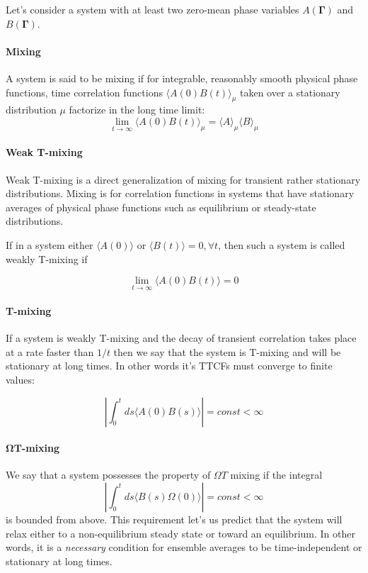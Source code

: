 \documentclass[a4paper,12pt,nofootinbib]{article}
\begin{document}
Let's consider a system with at least two zero-mean phase variables $A(\bm{\Gamma})$ and $B(\bm{\Gamma})$. 

\paragraph{Mixing}

A system is said to be mixing if for integrable, reasonably smooth physical phase functions, time correlation functions $\langle A(0) B(t) \rangle_{\mu}$ taken over a stationary distribution $\mu$ factorize in the long time limit:
\begin{equation}
  \lim_{t \to \infty} \langle A(0) B(t)\rangle_{\mu} = \langle A \rangle_{\mu} \langle B \rangle_{\mu}  
\end{equation}

\paragraph{Weak T-mixing}

Weak T-mixing is a direct generalization of mixing for transient rather stationary distributions. Mixing is for correlation functions in systems that have stationary averages of physical phase functions such as equilibrium or steady-state distributions.

If in a system either $\langle A(0) \rangle $ or $ \langle B(t) \rangle = 0, \forall t $, then such a system is called weakly T-mixing if

\begin{equation}
  \lim_{t \to \infty} \langle A(0) B(t) \rangle = 0
\end{equation}

\paragraph{T-mixing}
If a system is weakly T-mixing and the decay of transient correlation takes place at a rate faster than $1/t$ then we say that the system is T-mixing and will be stationary at long times. In other words it's TTCFs must converge to finite values:

\begin{equation}
  \left| \int_0^t ds \langle A(0) B(s) \rangle \right| = const < \infty 
\end{equation}


\paragraph{$\bm{\Omega T}$-mixing}
We say that a system possesses the property of $\Omega T$ mixing if the integral
\begin{equation}
    \left| \int_0^t ds \langle B(s) \Omega(0) \rangle \right| = const < \infty
\end{equation}
is bounded from above. This requirement let's us predict that the system will relax either to a non-equilibrium steady state or toward an equilibrium. In other words, it is a \textit{necessary} condition for ensemble averages to be time-independent or stationary at long times.
\end{document}
